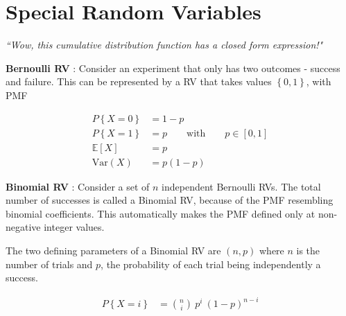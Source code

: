\chapter{Special Random Variables}


\begin{flushright}
	\textit{``Wow, this cumulative distribution function has a closed form expression!"} 
\end{flushright}

\textbf{Bernoulli RV} : Consider an experiment that only has two outcomes - success and failure. This can be represented by a RV that takes values $ \left\{0, 1\right\} $, with PMF

\begin{align}
	P \left\{X = 0\right\} &= 1-p \nonumber \\
	P \left\{X = 1\right\} &= p \qquad \text{with} \qquad p \in [0, 1] \\
	\mathbb{E}[X] &= p \\
	\mathrm{Var}(X) &= p(1-p)
\end{align}

\textbf{Binomial RV} : Consider a set of $ n $ independent Bernoulli RVs. The total number of successes is called a Binomial RV, because of the PMF resembling binomial coefficients. This automatically makes the PMF defined only at non-negative integer values.

\begin{figure}[!h]
	\centering
\end{figure}


The two defining parameters of a Binomial RV are $ (n, p) $ where $ n $ is the number of trials and $ p $, the probability of each trial being independently a success.

\begin{align}
	P \left\{X = i\right\} &= \binom{n}{i}\ p^i \ (1-p)^{n-i}
\end{align}

